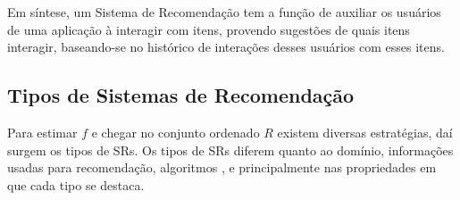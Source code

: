 \documentclass[normaltoc, espacoumemeio, pnumromarab,ruledheader]{abnt}
\begin{document}
Em síntese, um Sistema de Recomendação tem a função de auxiliar os usuários de uma aplicação à interagir com itens, provendo sugestões de quais itens interagir, baseando-se no histórico de interações desses usuários com esses itens.

 \subsection{Tipos de Sistemas de Recomendação}
 \label{subsec:tipossr}

Para estimar $f$ e chegar no conjunto ordenado $R$ existem diversas estratégias, daí surgem os tipos de SRs.
Os tipos de SRs diferem quanto ao domínio, informações usadas para recomendação, algoritmos \cite{Feldman2006}, e principalmente nas propriedades em que cada tipo se destaca.
\end{document}
